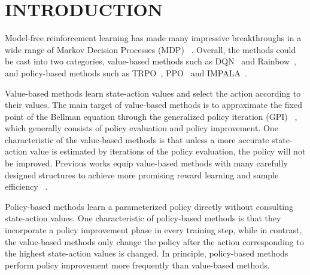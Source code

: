\section{INTRODUCTION}
\label{sec:intro}

Model-free reinforcement learning has made many impressive breakthroughs in a wide range of Markov Decision Processes (MDP) ~\citep{alpha_star,ftw,agent57}.
Overall, the methods could be cast into two categories, value-based methods such as DQN~\citep{dqn} and Rainbow~\citep{rainbow}, and  policy-based methods such as TRPO~\citep{trpo}, PPO~\citep{ppo} and IMPALA~\citep{impala}.  


Value-based methods learn state-action values and select the action according to their values. 
The main target of value-based methods is to approximate the fixed point of the Bellman equation through the generalized policy iteration (GPI) ~\citep{sutton}, which generally consists of policy evaluation and policy improvement. 
One characteristic of the value-based methods is that unless a more accurate state-action value is estimated by iterations of the policy evaluation, the policy will not be improved. 
Previous works equip value-based methods with many carefully designed structures to achieve more promising reward learning and sample efficiency ~\citep{dueling_q,priority_q,r2d2}.

Policy-based methods learn a parameterized policy directly without consulting state-action values.
One characteristic of policy-based methods is that they incorporate a policy improvement phase in every training step, while  
in contrast,  the value-based methods only change the policy after the action corresponding to the highest state-action values is changed. 
In principle, policy-based methods perform policy improvement more frequently than value-based methods.

